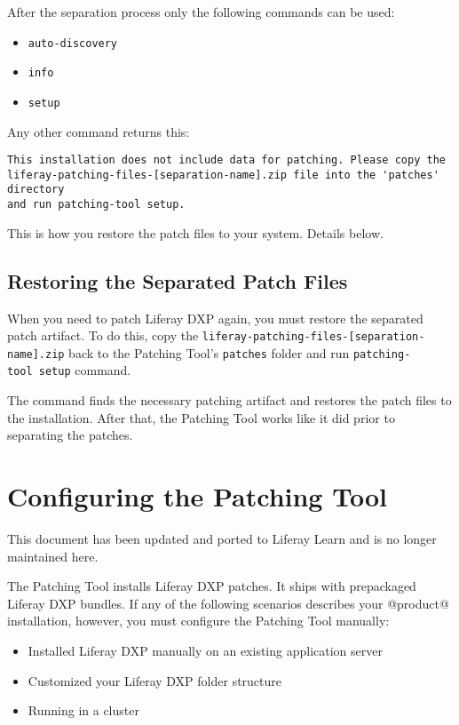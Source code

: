 After the separation process only the following commands can be used:

\begin{itemize}
\tightlist
\item
  \texttt{auto-discovery}
\item
  \texttt{info}
\item
  \texttt{setup}
\end{itemize}

Any other command returns this:

\begin{verbatim}
This installation does not include data for patching. Please copy the
liferay-patching-files-[separation-name].zip file into the 'patches' directory
and run patching-tool setup. 
\end{verbatim}

This is how you restore the patch files to your system. Details below.

\section{Restoring the Separated Patch
Files}\label{restoring-the-separated-patch-files}

When you need to patch Liferay DXP again, you must restore the separated
patch artifact. To do this, copy the
\texttt{liferay-patching-files-{[}separation-name{]}.zip} back to the
Patching Tool's \texttt{patches} folder and run
\texttt{patching-tool\ setup} command.

The command finds the necessary patching artifact and restores the patch
files to the installation. After that, the Patching Tool works like it
did prior to separating the patches.

\chapter{Configuring the Patching
Tool}\label{configuring-the-patching-tool}

{This document has been updated and ported to Liferay Learn and is no
longer maintained here.}

The Patching Tool installs Liferay DXP patches. It ships with
prepackaged Liferay DXP bundles. If any of the following scenarios
describes your @product@ installation, however, you must configure the
Patching Tool manually:

\begin{itemize}
\tightlist
\item
  Installed Liferay DXP manually on an existing application server
\item
  Customized your Liferay DXP folder structure
\item
  Running in a cluster
\end{itemize}

